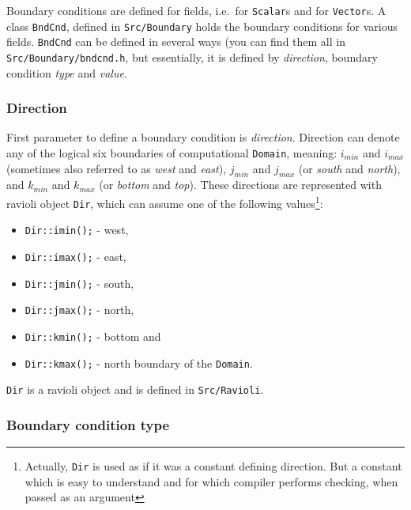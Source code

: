 Boundary conditions are defined for fields, i.e.\ for {\tt Scalar}s and
for {\tt Vector}s. A class {\tt BndCnd}, defined in {\tt Src/Boundary}
holds the boundary conditions for various fields. {\tt BndCnd} can be 
defined in several ways (you can find them all in {\tt Src/Boundary/bndcnd.h},
but essentially, it is defined by {\em direction}, boundary condition {\em type} 
and {\em value}.

\subsubsection{Direction}

First parameter to define a boundary condition is {\em direction}. 
Direction can denote any of the logical six boundaries of computational 
{\tt Domain}, meaning: $i_{min}$ and $i_{max}$ (sometimes also referred 
to as {\em west} and {\em east}), $j_{min}$ and $j_{max}$ (or {\em south} 
and {\em north}), and $k_{min}$ and $k_{max}$ (or {\em bottom} and {\em top}). 
These directions are represented with ravioli object {\tt Dir}, which can 
assume one of the following values\footnote{Actually, {\tt Dir} is used as
if it was a constant defining direction. But a constant which is easy
to understand and for which compiler performs checking, when passed as
an argument}:
%
\begin{itemize}
  \item {\tt Dir::imin();} - west,
  \item {\tt Dir::imax();} - east,
  \item {\tt Dir::jmin();} - south,
  \item {\tt Dir::jmax();} - north,
  \item {\tt Dir::kmin();} - bottom and
  \item {\tt Dir::kmax();} - north boundary of the {\tt Domain}.
\end{itemize}
%
{\tt Dir} is a ravioli object and is defined in {\tt Src/Ravioli}.

\subsubsection{Boundary condition type}

